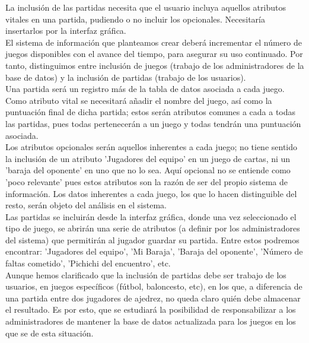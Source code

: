 La inclusión de las partidas necesita que el usuario incluya aquellos atributos vitales en una partida, pudiendo o no incluir los opcionales. Necesitaría insertarlos por la interfaz gráfica.\\

El sistema de información que planteamos crear deberá incrementar el número de juegos disponibles con el avance del tiempo, para asegurar su uso continuado. Por tanto, distinguimos entre inclusión de juegos (trabajo de los administradores de la base de datos) y la inclusión de partidas (trabajo de los usuarios).\\

Una partida será un registro más de la tabla de datos asociada a cada juego. Como atributo vital se necesitará añadir el nombre del juego, así como la puntuación final de dicha partida; estos serán atributos comunes a cada a todas las partidas, pues todas pertenecerán a un juego y todas tendrán una puntuación asociada.\\

Los atributos opcionales serán aquellos inherentes a cada juego; no tiene sentido la inclusión de un atributo 'Jugadores del equipo' en un juego de cartas, ni un 'baraja del oponente' en uno que no lo sea. Aquí opcional no se entiende como 'poco relevante' pues estos atributos son la razón de ser del propio sistema de información. Los datos inherentes a cada juego, los que lo hacen distinguible del resto, serán objeto del análisis en el sistema.\\

Las partidas se incluirán desde la interfaz gráfica, donde una vez seleccionado el tipo de juego, se abrirán una serie de atributos (a definir por los administradores del sistema) que permitirán al jugador guardar su partida. Entre estos podremos encontrar: 'Jugadores del equipo', 'Mi Baraja', 'Baraja del oponente', 'Número de faltas cometido', 'Pichichi del encuentro', etc.\\

Aunque hemos clarificado que la inclusión de partidas debe ser trabajo de los usuarios, en juegos específicos (fútbol, baloncesto, etc), en los que, a diferencia de una partida entre dos jugadores de ajedrez, no queda claro quién debe almacenar el resultado. Es por esto, que se estudiará la posibilidad de responsabilizar a los administradores de mantener la base de datos actualizada para los juegos en los que se de esta situación.
